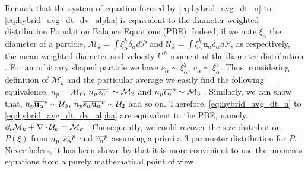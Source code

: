 Remark that the system of equation formed by \ref{eq:hybrid_avg_dt_n} to \ref{eq:hybrid_avg_dt_dv_alpha} is equivalent to the diameter weighted distribution  Population Balance Equations (PBE)\citet{KAMP20011363}. 
Indeed, if we note,$\xi_\alpha$ the diameter of a particle, $\mathcal{M}_k = \int  \xi^k_\alpha \delta_\alpha d\mathscr{P} $ and $\mathcal{U}_k = \int \xi_\alpha^k \textbf{u}_\alpha \delta_\alpha  d\mathscr{P}$, as respectively, the mean weighted diameter and velocity $k^{th}$ moment of the diameter distribution \citet{marchisio2013computational,zaepffel2012multisize}. 
For an arbitrary shaped particle we have $s_\alpha \sim \xi_\alpha^2$, $v_\alpha \sim \xi_\alpha^3$.
Thus, considering definition of $\mathcal{M}_k$ and the particular average we easily find the following equivalence,  $n_p = \mathcal{M}_0$, $n_p\overline{s_\alpha}^{p} \sim \mathcal{M}_2$ and $n_p\overline{v_\alpha}^{p} \sim \mathcal{M}_3$ \citet[Chapter 2]{zaepffel2012multisize}. 
Similarly, we can show that, $n_p\overline{\textbf{u}_\alpha}^{p}\sim\mathcal{U}_0$, $n_p\overline{s_\alpha\textbf{u}_\alpha}^{p}\sim\mathcal{U}_2$ and so on. 
Therefore, \ref{eq:hybrid_avg_dt_n} to \ref{eq:hybrid_avg_dt_dv_alpha} are equivalent to the PBE, namely, $\partial_t \mathcal{M}_k + \mathbf{\nabla} \cdot\mathcal{U}_k = \dot{\mathcal{M}_k}$ 
\citep{fox2023generalized,sporleder2012population,morel2010comparison,randolph2012theory}.
Consequently, we could recover the size distribution $P(\xi)$ from $n_p,\overline{s_\alpha}^{p}$ and $\overline{v_\alpha}^{p}$ assuming a priori a 3 parameter distribution for $P$.
Nevertheless, it has been shown by \citet{fox2023generalized} that it is more convenient to use the moments equations from a purely mathematical point of view. 


